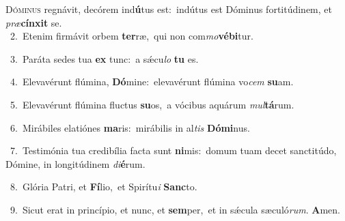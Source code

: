 \lettrine{\initial\textcolor{\initialcolor}{D}}{óminus} regnávit, decórem ind\-\textbf{ú}\-tus est:~\star indútus est Dóminus fortitúdinem, et \textit{præ}\-\textbf{cín}\textbf{xit} se.\\
{\numbfont\textcolor{\numbcolor}{~2.}}~Etenim firmávit orbem \textbf{ter}\-ræ,~\star qui non com\-\textit{mo}\-\textbf{vé}\textbf{bi}tur.\par
{\numbfont\textcolor{\numbcolor}{~3.}}~Paráta sedes tua \textbf{ex} tunc:~\star a sǽcu\textit{lo} \textbf{tu} es.\par
{\numbfont\textcolor{\numbcolor}{~4.}}~Elevavérunt flúmina, \textbf{Dó}\-mine:~\star elevavérunt flúmina vo\textit{cem} \textbf{su}\-am.\par
{\numbfont\textcolor{\numbcolor}{~5.}}~Elevavérunt flúmina fluctus \textbf{su}\-os,~\star a vócibus aquárum \textit{mul}\-\textbf{tá}rum.\par
{\numbfont\textcolor{\numbcolor}{~6.}}~Mirábiles elatiónes \textbf{ma}\-ris:~\star mirábilis in al\textit{tis} \textbf{Dó}\-\textbf{mi}nus.\par
{\numbfont\textcolor{\numbcolor}{~7.}}~Testimónia tua credibília facta sunt \textbf{ni}\-mis:~\star domum tuam decet sanctitúdo, Dómine, in longitúdinem \textit{di}\-\textbf{é}rum.\par
{\numbfont\textcolor{\numbcolor}{~8.}}~Glória Patri, et \textbf{Fí}\-lio,~\star et Spirítu\textit{i} \textbf{Sanc}\-to.\par
{\numbfont\textcolor{\numbcolor}{~9.}}~Sicut erat in princípio, et nunc, et \textbf{sem}\-per,~\star et in sǽcula sæculó\-\textit{rum}\-. \textbf{A}\-men.\par
